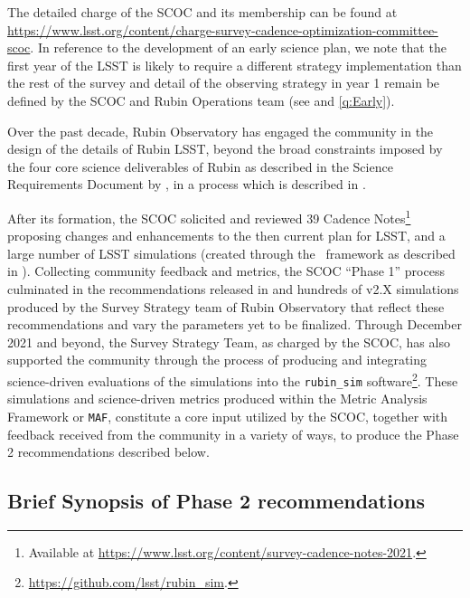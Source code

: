 The detailed charge of the SCOC and its membership can be found at \url{https://www.lsst.org/content/charge-survey-cadence-optimization-committee-scoc}. In reference to the development of an early science plan, we note that the first year of the LSST is likely to require a different strategy implementation than the rest of the survey and detail of the observing strategy in year 1 remain be defined by the SCOC and Rubin Operations team (see \citealt{rtn-011} and \autoref{q:Early}).

Over the past decade, Rubin Observatory has engaged the community in the design of the details of Rubin LSST, beyond the broad constraints imposed by the four core science deliverables of Rubin as described in the Science Requirements Document by \citet[][hereafter SRD]{LPM-17}, in a process which is described in \citet{2022ApJS..258....1B}. 

After its formation, the SCOC solicited %
and reviewed 39 Cadence Notes\footnote{\label{fn:cnotes}Available at \url{https://www.lsst.org/content/survey-cadence-notes-2021}.} proposing changes and enhancements to the then current plan for LSST, and a large number of LSST simulations (created through the \opsim\ framework as described in \citealt[][hereafter PSTN-051]{PSTN-051}). Collecting community feedback and metrics, the SCOC ``Phase 1'' process culminated in the recommendations released in  and hundreds of v2.X simulations produced by the Survey Strategy team of Rubin Observatory that reflect these recommendations and vary the parameters yet to be finalized. 
Through December 2021 and beyond, the Survey Strategy Team, as charged by the SCOC, has also supported the community through the process of producing and integrating science-driven evaluations of the simulations into the \texttt{rubin\_sim} software\footnote{\url{https://github.com/lsst/rubin_sim}.}. These simulations and science-driven metrics produced within the Metric Analysis Framework \citep{2014SPIE.9149E..0BJ} or \texttt{MAF},  constitute a core input utilized by the SCOC, together with feedback received from the community in a variety of ways, to produce the Phase 2 recommendations described below. 




\subsection{Brief Synopsis of Phase 2 recommendations}\label{sec:shortrec}

